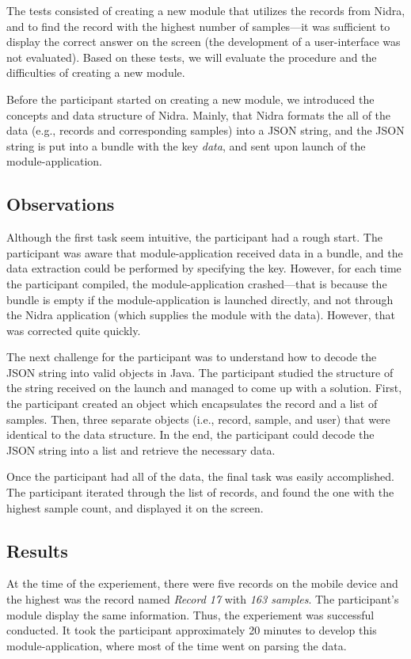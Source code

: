  The tests consisted of creating a new module that utilizes the records from Nidra, and to find the record with the highest number of samples---it was sufficient to display the correct answer on the screen (the development of a user-interface was not evaluated). Based on these tests, we will evaluate the procedure and the difficulties of creating a new module. 

Before the participant started on creating a new module, we introduced the concepts and data structure of Nidra. Mainly, that Nidra formats the all of the data (e.g., records and corresponding samples) into a JSON string, and the JSON string is put into a bundle with the key \textit{data}, and sent upon launch of the module-application. 


\subsection{Observations}
Although the first task seem intuitive, the participant had a rough start. The participant was aware that module-application received data in a bundle, and the data extraction could be performed by specifying the key. However, for each time the participant compiled, the module-application crashed---that is because the bundle is empty if the module-application is launched directly, and not through the Nidra application (which supplies the module with the data). However, that was corrected quite quickly. 

The next challenge for the participant was to understand how to decode the JSON string into valid objects in Java. The participant studied the structure of the string received on the launch and managed to come up with a solution. First, the participant created an object which encapsulates the record and a list of samples. Then, three separate objects (i.e., record, sample, and user) that were identical to the data structure. In the end, the participant could decode the JSON string into a list and retrieve the necessary data.

Once the participant had all of the data, the final task was easily accomplished. The participant iterated through the list of records, and found the one with the highest sample count, and displayed it on the screen. 

\subsection{Results}

At the time of the experiement, there were five records on the mobile device and the highest was the record named \textit{Record 17} with \textit{163 samples}. The participant's module display the same information. Thus, the experiement was successful conducted. It took the participant approximately 20 minutes to develop this module-application, where most of the time went on parsing the data.

